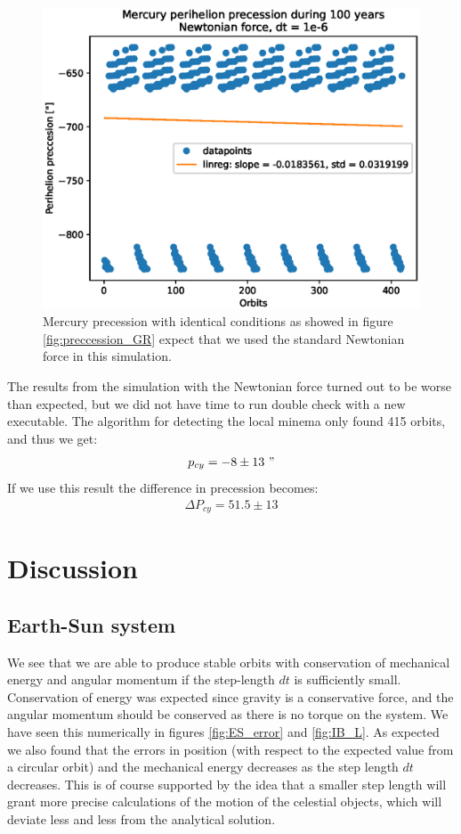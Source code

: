 \documentclass[american,a4paper,12pt]{article}
\begin{document}
\begin{figure}[H]
    \centering
    \includegraphics[width = \textwidth]{figures/Mercury_precession_newton.eps}
    \caption{Mercury precession with identical conditions as showed in figure \ref{fig:preccession_GR} expect that we used the standard Newtonian force in this simulation.}
    \label{fig:precession_Newton}
\end{figure}
The results from the simulation with the Newtonian force turned out to be worse than expected, but we did not have time to run double check with a new executable. The algorithm for detecting the local minema only found 415 orbits, and thus we get:
\begin{align*}
    p_{cy} = -8 \pm 13 \ " 
\end{align*}
If we use this result the difference in precession becomes:
\begin{align*}
    \Delta P_{cy} = 51.5 \pm 13
\end{align*}
\newpage
\section{Discussion}
\subsection{Earth-Sun system}
We see that we are able to produce stable orbits with conservation of mechanical energy and angular momentum if the step-length $dt$ is sufficiently small. Conservation of energy was expected since gravity is a conservative force, and the angular momentum should be conserved as there is no torque on the system. We have seen this numerically in figures \ref{fig:ES_error} and \ref{fig:IB_L}. As expected we also found that the errors in position (with respect to the expected value from a circular orbit) and the mechanical energy decreases as the step length $dt$ decreases. This is of course supported by the idea that a smaller step length will grant more precise calculations of the motion of the celestial objects, which will deviate less and less from the analytical solution.
\end{document}
